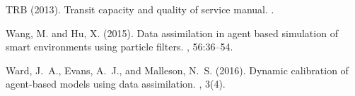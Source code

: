\documentclass[11pt]{article}
\providecommand{\DIFaddbegin}{} %
\newcommand{\DIFaddincludegraphics}[2][]{{\color{blue}\fbox{\DIFOincludegraphics[#1]{#2}}}} %
\DeclareRobustCommand{\DIFaddbegin}{\DIFOaddbegin \let\includegraphics\DIFaddincludegraphics} %
\begin{document}
\begin{thebibliography}{}
TRB (2013).
\newblock Transit capacity and quality of service manual.
.

Wang, M. and Hu, X. (2015).
\newblock Data assimilation in agent based simulation of smart environments
  using particle filters.
, 56:36--54.

Ward, J.~A., Evans, A.~J., and Malleson, N.~S. (2016).
\newblock Dynamic calibration of agent-based models using data assimilation.
, 3(4).

\end{thebibliography}
\DIFaddbegin 
\end{document}
